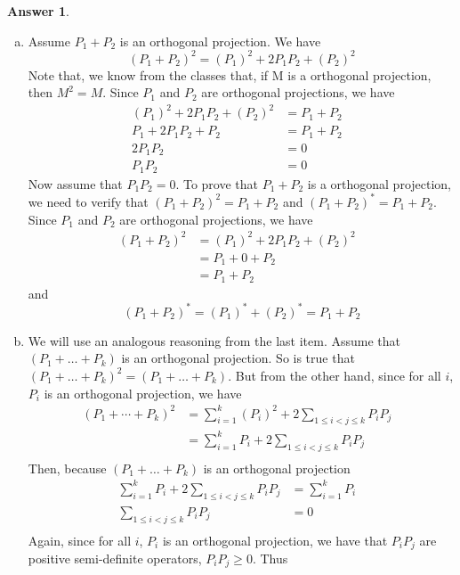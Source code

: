 \documentclass[12pt]{article}
\theoremstyle{plain}
\theoremstyle{definition}
\newtheorem{ans}{Answer}
\begin{document}
\noindent \hrulefill

\begin{ans}
	\begin{enumerate}[(a)]
		\item Assume $P_1 + P_2$ is an orthogonal projection. We have
			\[ (P_1 + P_2)^2 = (P_1)^2 + 2P_1P_2 + (P_2)^2 \]
			Note that, we know from the classes that, if M is a orthogonal projection, then $M^2 = M$.
			Since $P_1$ and $P_2$ are orthogonal projections, we have
			\begin{align*}
				(P_1)^2 + 2P_1P_2 + (P_2)^2 &= P_1 + P_2&\\
				P_1 + 2P_1P_2 + P_2 &= P_1 + P_2&\\
				2P_1P_2 &= 0&\\
				P_1P_2 &= 0
			\end{align*}
			Now assume that $P_1P_2 = 0$. To prove that $P_1 + P_2$ is a orthogonal projection,
			we need to verify that $(P_1 + P_2)^2 = P_1 + P_2$ and $(P_1 + P_2)^{*}=P_1 + P_2$.
			Since $P_1$ and $P_2$ are orthogonal projections, we have
			\begin{align*}
				(P_1 + P_2)^2 &= (P_1)^2 + 2P_1P_2 + (P_2)^2&\\
				&= P_1 + 0 + P_2&\\
				&= P_1 + P_2
			\end{align*}
			and
			\[ (P_1 + P_2)^{*} = (P_1)^{*} + (P_2)^{*} = P_1 + P_2\]
		\item We will use an analogous reasoning from the last item.
			Assume that $(P_1 + \dots + P_k)$ is an orthogonal projection. So is true that
			$(P_1 + \dots + P_k)^2 = (P_1 + \dots + P_k)$.
			But from the other hand, since for all $i$, $P_i$ is an orthogonal projection, we have
			\begin{align*}
				(P_1 + \cdots + P_k)^2 &= \sum_{i=1}^{k} (P_i)^2 + 2\sum_{1 \leq i < j \leq k}P_iP_j&\\
				&= \sum_{i=1}^{k} P_i  + 2\sum_{1 \leq i < j \leq k}P_iP_j&\\
			\end{align*}
			Then, because $(P_1 + \dots + P_k)$ is an orthogonal projection
			\begin{align*}
				\sum_{i=1}^{k} P_i  + 2\sum_{1 \leq i < j \leq k}P_iP_j &= \sum_{i=1}^{k} P_i&\\
				\sum_{1 \leq i < j \leq k}P_iP_j &= 0&\\
			\end{align*}
			Again, since for all $i$, $P_i$ is an orthogonal projection, we have that $P_iP_j$
			are positive semi-definite operators, $P_iP_j \geq 0$. Thus

\end{enumerate}
\end{ans}
\end{document}
